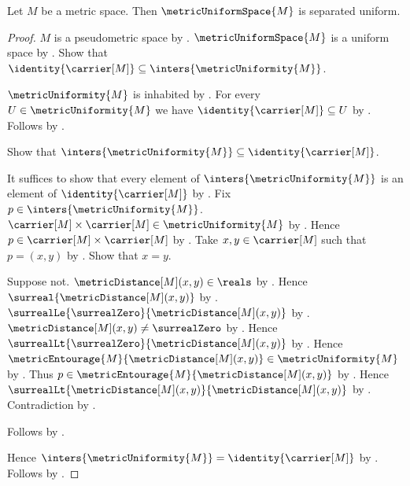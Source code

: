 \begin{theorem}\label{metric_uniform_space_is_separated}
    Let $M$ be a metric space.
    Then $\metricUniformSpace{M}$ is separated uniform.
\end{theorem}
\begin{proof}
    $M$ is a pseudometric space by
        .
    $\metricUniformSpace{M}$ is a uniform space
        by .
    Show that
        $\identity{\carrier[M]}\subseteq\inters{\metricUniformity{M}}$.
    \begin{subproof}
        $\metricUniformity{M}$ is inhabited
            by .
        For every $U\in\metricUniformity{M}$ we have
            $\identity{\carrier[M]}\subseteq U$
            by .
        Follows by .
    \end{subproof}
    Show that
        $\inters{\metricUniformity{M}}\subseteq
            \identity{\carrier[M]}$.
    \begin{subproof}
        It suffices to show that every element of
            $\inters{\metricUniformity{M}}$ is an element of
            $\identity{\carrier[M]}$ by .
        Fix $p\in\inters{\metricUniformity{M}}$.
        $\carrier[M]\times\carrier[M]\in\metricUniformity{M}$
            by .
        Hence $p\in\carrier[M]\times\carrier[M]$
            by .
        Take $x,y\in\carrier[M]$ such that $p=(x,y)$
            by .
        Show that $x=y$.
        \begin{subproof}
            Suppose not.
            $\metricDistance[M](x,y)\in\reals$
                by .
            Hence $\surreal{\metricDistance[M](x,y)}$
                by .
            $\surrealLe{\surrealZero}{\metricDistance[M](x,y)}$
                by .
            $\metricDistance[M](x,y)\neq\surrealZero$
                by .
            Hence
                $\surrealLt{\surrealZero}{\metricDistance[M](x,y)}$
                by .
            Hence
                $\metricEntourage{M}{\metricDistance[M](x,y)}
                    \in\metricUniformity{M}$
                by .
            Thus
                $p\in\metricEntourage{M}{\metricDistance[M](x,y)}$
                by .
            Hence
                $\surrealLt{\metricDistance[M](x,y)}
                    {\metricDistance[M](x,y)}$
                by .
            Contradiction by .
        \end{subproof}
        Follows by .
    \end{subproof}
    Hence
        $\inters{\metricUniformity{M}}=\identity{\carrier[M]}$
        by .
    Follows by
        .
\end{proof}
